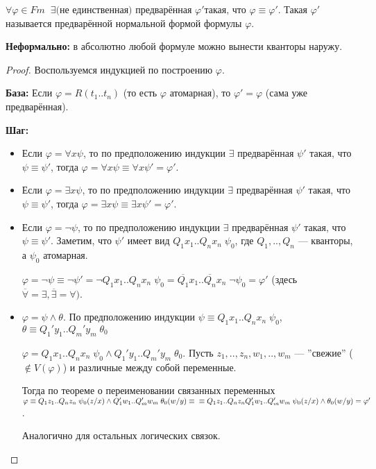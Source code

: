 \documentclass[a4paper, fleqn]{article}
\begin{document}
    \begin{theorem}
        $\forall \varphi \in Fm \;\; \exists \text{(не единственная) предварённая } \varphi' \text{такая, что } \varphi \equiv \varphi'$. Такая $\varphi'$ называется предварённой нормальной формой формулы $\varphi$.
    \end{theorem}

    \textbf{Неформально:} в абсолютно любой формуле можно вынести кванторы наружу.

    \begin{proof}
        Воспользуемся индукцией по построению $\varphi$.

        \textbf{База: } Если $\varphi = R(t_1..t_n)$ (то есть $\varphi$ атомарная), то $\varphi' = \varphi$ (сама уже предварённая).

        \textbf{Шаг:}
        \begin{itemize}
        \item Если $\varphi = \forall x \psi$, то по предположению индукции $\exists$ предварённая $\psi'$ такая, что $\psi \equiv \psi'$, тогда $\varphi = \forall x \psi \equiv \forall x \psi' = \varphi'$.
        \item Если $\varphi = \exists x \psi$, то по предположению индукции $\exists$ предварённая $\psi'$ такая, что $\psi \equiv \psi'$, тогда $\varphi = \exists x \psi \equiv \exists x \psi' = \varphi'$.
        \item Если $\varphi = \neg \psi$, то по предположению индукции $\exists$ предварённая $\psi'$ такая, что $\psi \equiv \psi'$. Заметим, что $\psi'$ имеет вид $Q_1x_1..Q_nx_n \; \psi_0$, где $Q_1,..,Q_n$ --- кванторы, а $\psi_0$ атомарная.

        $\varphi = \neg \psi \equiv \neg \psi' = \neg Q_1x_1..Q_nx_n \; \psi_0 = \overline{Q_1}x_1..\overline{Q_n}x_n \; \neg \psi_0 = \varphi'$ (здесь $\overline{\forall} = \exists, \overline{\exists} = \forall)$.
        \item $\varphi = \psi \wedge \theta$. По предположению индукции $\psi \equiv Q_1x_1..Q_nx_n \; \psi_0$, $\theta \equiv Q_1'y_1..Q_m'y_m \; \theta_0$

        $\varphi = Q_1x_1..Q_nx_n \; \psi_0 \wedge Q_1'y_1..Q_m'y_m \; \theta_0$. Пусть $z_1, .., z_n, w_1, .., w_m$ --- ''свежие''{} ($\notin V(\varphi)$) и различные между собой переменные.

        Тогда по теореме о переименовании связанных переменных $\varphi \equiv  Q_1z_1..Q_nz_n \; \psi_0(z/x) \wedge Q_1'w_1..Q_m'w_m \; \theta_0(w/y) \equiv \\ \equiv Q_1z_1..Q_nz_n Q_1'w_1..Q_m'w_m \; \psi_0(z/x) \wedge \theta_0(w/y) = \varphi'$.

        Аналогично для остальных логических связок.
        \end{itemize}
    \end{proof}
\end{document}

